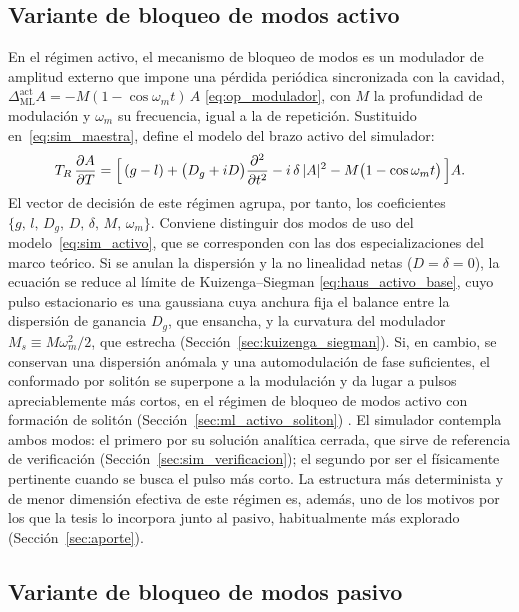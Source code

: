 \subsection{Variante de bloqueo de modos activo}
\label{sec:sim_activo}

En el régimen activo, el mecanismo de bloqueo de modos es un modulador de amplitud
externo que impone una pérdida periódica sincronizada con la cavidad,
$\Delta_{\mathrm{ML}}^{\text{act}}A=-M(1-\cos\omega_m t)\,A$
\eqref{eq:op_modulador}, con $M$ la profundidad de modulación y $\omega_m$ su
frecuencia, igual a la de repetición. Sustituido en~\eqref{eq:sim_maestra}, define
el modelo del brazo activo del simulador:
%
\begin{equation}
    T_R\,\frac{\partial A}{\partial T}
    = \Bigl[\,(g-l)
      + \bigl(D_g + iD\bigr)\frac{\partial^2}{\partial t^2}
      - i\,\delta\,|A|^2
      - M\bigl(1-\cos\omega_m t\bigr) \,\Bigr] A .
    \label{eq:sim_activo}
\end{equation}
%
El vector de decisión de este régimen agrupa, por tanto, los coeficientes
$\{g,\,l,\,D_g,\,D,\,\delta,\,M,\,\omega_m\}$. Conviene distinguir dos modos de uso
del modelo~\eqref{eq:sim_activo}, que se corresponden con las dos especializaciones
del marco teórico. Si se anulan la dispersión y la no linealidad netas
($D=\delta=0$), la ecuación se reduce al límite de Kuizenga--Siegman
\eqref{eq:haus_activo_base}, cuyo pulso estacionario es una gaussiana cuya anchura
fija el balance entre la dispersión de ganancia $D_g$, que ensancha, y la curvatura
del modulador $M_s\equiv M\omega_m^2/2$, que estrecha
(Sección~\ref{sec:kuizenga_siegman}). Si, en cambio, se conservan una dispersión
anómala y una automodulación de fase suficientes, el conformado por solitón se
superpone a la modulación y da lugar a pulsos apreciablemente más cortos, en el
régimen de bloqueo de modos activo con formación de solitón
(Sección~\ref{sec:ml_activo_soliton}) \cite{Kaertner2020}. El simulador contempla
ambos modos: el primero por su solución analítica cerrada, que sirve de referencia
de verificación (Sección~\ref{sec:sim_verificacion}); el segundo por ser el
físicamente pertinente cuando se busca el pulso más corto. La estructura más
determinista y de menor dimensión efectiva de este régimen es, además, uno de los
motivos por los que la tesis lo incorpora junto al pasivo, habitualmente más
explorado (Sección~\ref{sec:aporte}).

\subsection{Variante de bloqueo de modos pasivo}
\label{sec:sim_pasivo}


